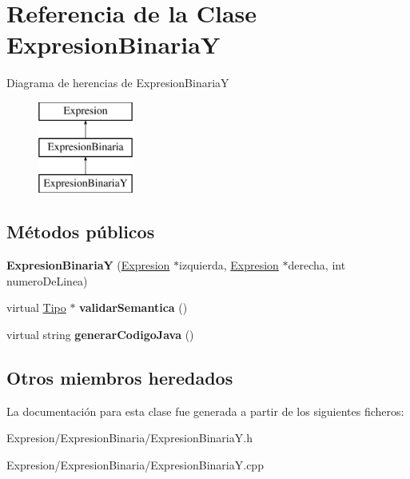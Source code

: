 \hypertarget{class_expresion_binaria_y}{\section{Referencia de la Clase Expresion\-Binaria\-Y}
\label{class_expresion_binaria_y}
}
Diagrama de herencias de Expresion\-Binaria\-Y\begin{figure}[H]
\begin{center}
\leavevmode
\includegraphics[height=3.000000cm]{class_expresion_binaria_y}
\end{center}
\end{figure}
\subsection*{Métodos públicos}
\begin{DoxyCompactItemize}
\item 
\hypertarget{class_expresion_binaria_y_a5f7fd923a07dca79556a75aec5ae1da7}{{\bfseries Expresion\-Binaria\-Y} (\hyperlink{class_expresion}{Expresion} $\ast$izquierda, \hyperlink{class_expresion}{Expresion} $\ast$derecha, int numero\-De\-Linea)}\label{class_expresion_binaria_y_a5f7fd923a07dca79556a75aec5ae1da7}

\item 
\hypertarget{class_expresion_binaria_y_aab6f1c529ea8c217962d57aad58184d4}{virtual \hyperlink{class_tipo}{Tipo} $\ast$ {\bfseries validar\-Semantica} ()}\label{class_expresion_binaria_y_aab6f1c529ea8c217962d57aad58184d4}

\item 
\hypertarget{class_expresion_binaria_y_a330a00b50de8bca9c62fc0af43b58d5e}{virtual string {\bfseries generar\-Codigo\-Java} ()}\label{class_expresion_binaria_y_a330a00b50de8bca9c62fc0af43b58d5e}

\end{DoxyCompactItemize}
\subsection*{Otros miembros heredados}


La documentación para esta clase fue generada a partir de los siguientes ficheros\-:\begin{DoxyCompactItemize}
\item 
Expresion/\-Expresion\-Binaria/Expresion\-Binaria\-Y.\-h\item 
Expresion/\-Expresion\-Binaria/Expresion\-Binaria\-Y.\-cpp\end{DoxyCompactItemize}
